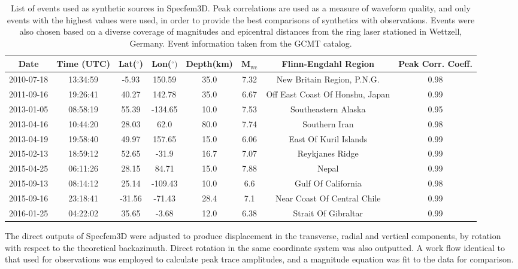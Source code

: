\documentclass{gji}
\begin{document}
\begin{table*}
\begin{minipage}{150mm}
	\begin{center}
		\begin{tabular}{ |c|c|c|c|c|c|c|c| } 
		\bf{Date} & \bf{Time (UTC)} & \bf{Lat($^\circ$)} & \bf{Lon($^\circ)$} & \bf{Depth(km)} & \bf{M$_{\text{wc}}$} &\bf{Flinn-Engdahl Region} &\bf{Peak Corr. Coeff.}\\ \hline
	2010-07-18 & 13:34:59 & -5.93 & 150.59 & 35.0 & 7.32 & New Britain Region, P.N.G. & 0.98\\
	2011-09-16 & 19:26:41 & 40.27 & 142.78 & 35.0 & 6.67 & Off East Coast Of Honshu, Japan & 0.99\\
	2013-01-05 & 08:58:19 & 55.39 & -134.65 & 10.0 & 7.53 & Southeastern Alaska & 0.95\\
	2013-04-16 & 10:44:20 & 28.03 & 62.0 & 80.0 & 7.74 & Southern Iran & 0.98\\
	2013-04-19 & 19:58:40 & 49.97 & 157.65 & 15.0 & 6.06 & East Of Kuril Islands & 0.99\\
	2015-02-13 & 18:59:12 & 52.65 & -31.9 & 16.7 & 7.07 & Reykjanes Ridge & 0.99\\
	2015-04-25 & 06:11:26 & 28.15 & 84.71 & 15.0 & 7.88 & Nepal & 0.99\\
	2015-09-13 & 08:14:12 & 25.14 & -109.43 & 10.0 & 6.6 & Gulf Of California & 0.98\\
	2015-09-16 & 23:18:41 & -31.56 & -71.43 & 28.4 & 7.1 & Near Coast Of Central Chile & 0.99\\
	2016-01-25 & 04:22:02 & 35.65 & -3.68 & 12.0 & 6.38 & Strait Of Gibraltar & 0.99\\
		\end{tabular}
    		\caption{List of events used as synthetic sources in Specfem3D. Peak correlations are used as a measure of waveform quality, and only events with the highest values were used, in order to provide the best comparisons of synthetics with observations. Events were also chosen based on a diverse coverage of magnitudes and epicentral distances from the ring laser stationed in Wettzell, Germany. Event information taken from the GCMT catalog.}
		\label{tab:syn_events}
	\end{center}
	\end{minipage}
\end{table*}

The direct outputs of Specfem3D were adjusted to produce displacement in the transverse, radial and vertical components, by rotation with respect to the theoretical backazimuth. Direct rotation in the same coordinate system was also outputted. A work flow identical to that used for observations was employed to calculate peak trace amplitudes, and a magnitude equation was fit to the data for comparison.
\end{document}
